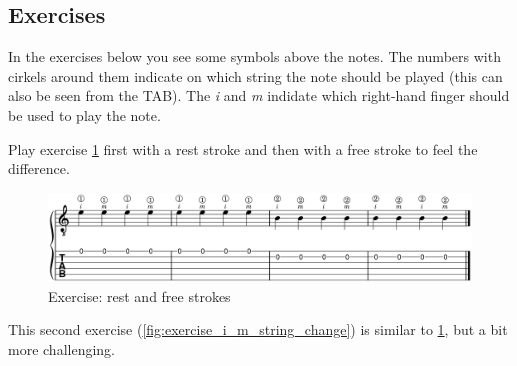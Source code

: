 \newpage

\subsection{Exercises}

In the exercises below you see some symbols above the notes. The numbers with cirkels around them indicate on which string the note should be played (this can also be seen from the TAB). The \textit{i} and \textit{m} indidate which right-hand finger should be used to play the note.

Play exercise \ref{fig:exercise_rest_free_stroke} first with a rest stroke and then with a free stroke to feel the difference.

\begin{figure}[h]
    \centering
    \includegraphics[width=\textwidth]{image/OpenEnVallendeAanslag.png}
    \caption{Exercise: rest and free strokes}
    \label{fig:exercise_rest_free_stroke}
\end{figure}

This second exercise (\ref{fig:exercise_i_m_string_change}) is similar to \ref{fig:exercise_rest_free_stroke}, but a bit more challenging.

